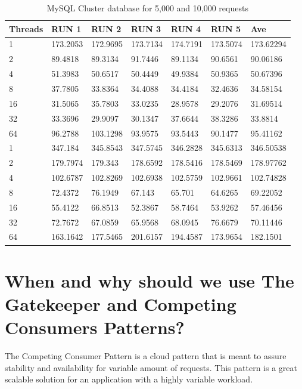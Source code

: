 \documentclass{article}
\begin{document}
\begin{table}[]
	\centering
	\caption{MySQL Cluster database for 5,000 and 10,000 requests}
	\label{my-label}
	\begin{tabular}{@{}lllllll@{}}
		\toprule
		Threads & RUN 1    & RUN 2    & RUN 3    & RUN 4    & RUN 5    & Ave       \\ \midrule
		1       & 173.2053 & 172.9695 & 173.7134 & 174.7191 & 173.5074 & 173.62294 \\
		2       & 89.4818  & 89.3134  & 91.7446  & 89.1134  & 90.6561  & 90.06186  \\
		4       & 51.3983  & 50.6517  & 50.4449  & 49.9384  & 50.9365  & 50.67396  \\
		8       & 37.7805  & 33.8364  & 34.4088  & 34.4184  & 32.4636  & 34.58154  \\
		16      & 31.5065  & 35.7803  & 33.0235  & 28.9578  & 29.2076  & 31.69514  \\
		32      & 33.3696  & 29.9097  & 30.1347  & 37.6644  & 38.3286  & 33.8814   \\
		64      & 96.2788  & 103.1298 & 93.9575  & 93.5443  & 90.1477  & 95.41162  \\
		1       & 347.184  & 345.8543 & 347.5745 & 346.2828 & 345.6313 & 346.50538 \\
		2       & 179.7974 & 179.343  & 178.6592 & 178.5416 & 178.5469 & 178.97762 \\
		4       & 102.6787 & 102.8269 & 102.6938 & 102.5759 & 102.9661 & 102.74828 \\
		8       & 72.4372  & 76.1949  & 67.143   & 65.701   & 64.6265  & 69.22052  \\
		16      & 55.4122  & 66.8513  & 52.3867  & 58.7464  & 53.9262  & 57.46456  \\
		32      & 72.7672  & 67.0859  & 65.9568  & 68.0945  & 76.6679  & 70.11446  \\
		64      & 163.1642 & 177.5465 & 201.6157 & 194.4587 & 173.9654 & 182.1501  \\ \bottomrule
	\end{tabular}
\end{table}

\section{When and why should we use The Gatekeeper and Competing Consumers Patterns?}\label{Q2}

The Competing Consumer Pattern is a cloud pattern that is meant to assure stability and availability for variable amount of requests. This pattern is a great scalable solution for an application with a highly variable workload. 
\end{document}
